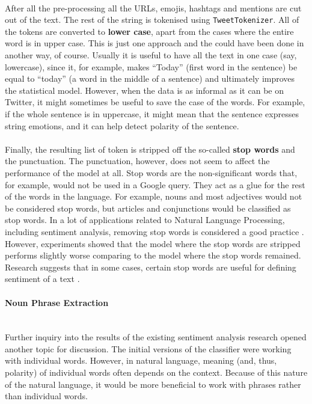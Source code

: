 \paragraph{}
After all the pre-processing all the URLs, emojis, hashtags and mentions are cut out of the text. The rest of the string is tokenised using \texttt{TweetTokenizer}. All of the tokens are converted to \textbf{lower case}, apart from the cases where the entire word is in upper case. This is just one approach and the could have been done in another way, of course. Usually it is useful to have all the text in one case (say, lowercase), since it, for example, makes ``Today'' (first word in the sentence) be equal to ``today'' (a word in the middle of a sentence) and ultimately improves the statistical model. However, when the data is as informal as it can be on Twitter, it might sometimes be useful to save the case of the words. For example, if the whole sentence is in uppercase, it might mean that the sentence expresses string emotions, and it can help detect polarity of the sentence. 

\paragraph{}
Finally, the resulting list of token is stripped off the so-called \textbf{stop words} and the punctuation. 
The punctuation, however, does not seem to affect the performance of the model at all. Stop words are the non-significant words that, for example, would not be used in a Google query. They act as a glue for the rest of the words in the language. For example, nouns and most adjectives would not be considered stop words, but  articles and conjunctions would be classified as stop words. In a lot of applications related to Natural Language Processing, including sentiment analysis, removing stop words is considered a good practice \cite{poursepanj2013uottawa, kouloumpis2011twitter}. However, experiments showed that the model where the stop words are stripped performs slightly worse comparing to the model where the stop words remained. Research suggests that in some cases, certain stop words are useful for defining sentiment of a text \cite{lin2009joint}. 


\paragraph{Noun Phrase Extraction}\mbox{}\\
Further inquiry into the results of the existing sentiment analysis research opened another topic for discussion. The initial versions of the classifier were working with individual words. However, in natural language, meaning (and, thus, polarity) of individual words often depends on the context. Because of this nature of the natural language, it would be more beneficial to work with phrases rather than individual words. 

